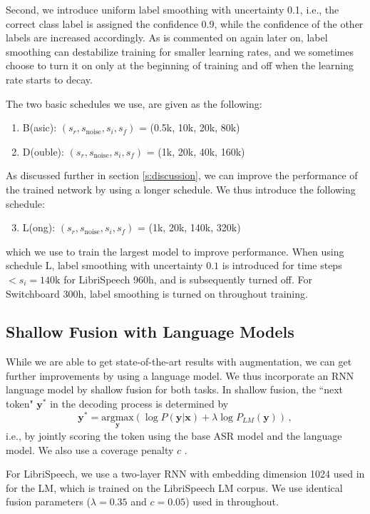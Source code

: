 \documentclass[a4paper]{article}
\newcommand{\be}{\begin{equation}}
\newcommand{\ee}{\end{equation}}
\begin{document}
Second, we introduce uniform label smoothing \cite{lbsm} with uncertainty 0.1, i.e., the correct class label is assigned the confidence 0.9, while the confidence of the other labels are increased accordingly. As is commented on again later on, label smoothing can destabilize training for smaller learning rates, and we sometimes choose to turn it on only at the beginning of training and off when the learning rate starts to decay.

The two basic schedules we use, are given as the following:
\begin{enumerate}
\item B(asic): $(s_r, s_\text{noise}, s_i, s_f)$ = (0.5k, 10k, 20k, 80k)
\item D(ouble): $(s_r, s_\text{noise}, s_i, s_f)$ = (1k, 20k, 40k, 160k)
\end{enumerate}
As discussed further in section \ref{s:discussion}, we can improve the performance of the trained network by using a longer schedule. We thus introduce the following schedule:
\begin{enumerate}
  \setcounter{enumi}{2}
  \item L(ong): $(s_r, s_\text{noise}, s_i, s_f)$ = (1k, 20k, 140k, 320k)
\end{enumerate}
which we use to train the largest model to improve performance. When using schedule L, label smoothing with uncertainty $0.1$ is introduced for time steps $< s_i = \text{140k}$ for LibriSpeech 960h, and is subsequently turned off. For Switchboard 300h, label smoothing is turned on throughout training.


\subsection{Shallow Fusion with Language Models}


While we are able to get state-of-the-art results with augmentation, we can get further improvements by using a language model. We thus incorporate an RNN language model by shallow fusion for both tasks. In shallow fusion, the ``next token" $\mathbf{y}^*$ in the decoding process is determined by
\be
\mathbf{y}^* = \underset{\mathbf{y}}{\text{argmax}} \left( \log P(\mathbf{y} | \mathbf{x}) + \lambda \log P_{LM} (\mathbf{y})\right) \,,
\ee
i.e., by jointly scoring the token using the base ASR model and the language model. We also use a coverage penalty $c$ \cite{chorowski-2017-interspeech}.

For LibriSpeech, we use a two-layer RNN with embedding dimension 1024 used in \cite{irie-arxiv-2019} for the LM, which is trained on the LibriSpeech LM corpus. We use identical fusion parameters ($\lambda =0.35$ and $c=0.05$) used in \cite{irie-arxiv-2019} throughout.
\end{document}
